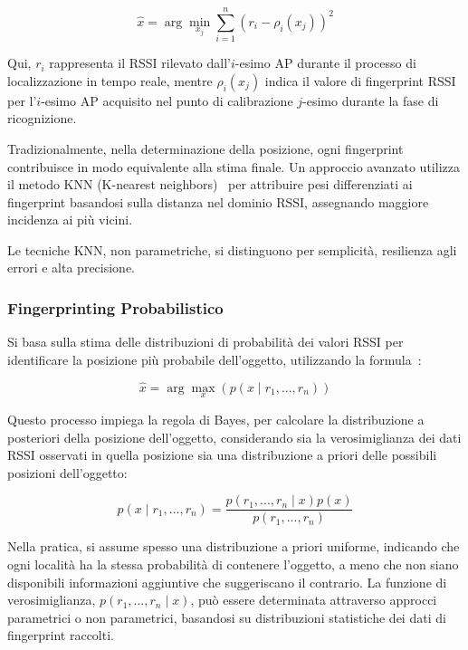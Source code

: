 \begin{equation}
    \hat{x} = \arg\min_{x_j} \sum_{i=1}^{n} (r_i - \rho_i(x_j))^2
\end{equation}

\noindent Qui, $r_i$ rappresenta il RSSI rilevato dall'$i$-esimo AP durante il processo di localizzazione in tempo reale, mentre $\rho_i(x_j)$ indica il valore di fingerprint RSSI per l'$i$-esimo AP acquisito nel punto di calibrazione $j$-esimo durante la fase di ricognizione.

Tradizionalmente, nella determinazione della posizione, ogni fingerprint contribuisce in modo equivalente alla stima finale. Un approccio avanzato utilizza il metodo KNN (K-nearest neighbors)~\cite{Honkavirta2009} per attribuire pesi differenziati ai fingerprint basandosi sulla distanza nel dominio RSSI, assegnando maggiore incidenza ai più vicini.

Le tecniche KNN, non parametriche, si distinguono per semplicità, resilienza agli errori e alta precisione.

\subsubsection{Fingerprinting Probabilistico}
\hspace{\parindent}Si basa sulla stima delle distribuzioni di probabilità dei valori RSSI per identificare la posizione più probabile dell'oggetto, utilizzando la formula~\cite{Seco2009}:

\begin{equation}
    \hat{x} = \arg\max_x (p(x \mid r_1, ..., r_n))
\end{equation}

\noindent Questo processo impiega la regola di Bayes, per calcolare la distribuzione a posteriori della posizione dell'oggetto, considerando sia la verosimiglianza dei dati RSSI osservati in quella posizione sia una distribuzione a priori delle possibili posizioni dell'oggetto:

\begin{equation}
    p(x \mid r_1, ..., r_n) = \frac{p(r_1, ..., r_n \mid x) p(x)}{p(r_1, ..., r_n)}
\end{equation}

\noindent Nella pratica, si assume spesso una distribuzione a priori uniforme, indicando che ogni località ha la stessa probabilità di contenere l'oggetto, a meno che non siano disponibili informazioni aggiuntive che suggeriscano il contrario. La funzione di verosimiglianza, $ p(r_1, ..., r_n \mid x) $, può essere determinata attraverso approcci parametrici o non parametrici, basandosi su distribuzioni statistiche dei dati di fingerprint raccolti.


